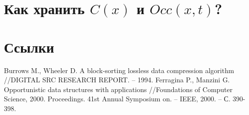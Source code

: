 \documentclass[letterpaper, 11pt]{article}
\begin{document}
\section{Как хранить $C(x)$ и $Occ(x, t)$?}
\section{Ссылки}

\begingroup
\renewcommand{\section}[2]{}%
\begin{thebibliography}{7}
Burrows M., Wheeler D. A block-sorting lossless data compression algorithm //DIGITAL SRC RESEARCH REPORT. – 1994.
Ferragina P., Manzini G. Opportunistic data structures with applications //Foundations of Computer Science, 2000. Proceedings. 41st Annual Symposium on. – IEEE, 2000. – С. 390-398.

\end{thebibliography}
\endgroup
\end{document}
